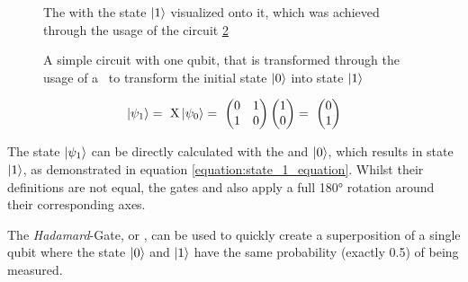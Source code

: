 \begin{figure}[!h]
    \centering
    \scalebox{\blochwidth}{
        
    }
    \caption{The \bloch with the state $\ket{1}$ visualized onto it, which was achieved through the usage of the circuit \ref{figure:x_circuit}}
    \label{figure:state_1_bloch_sphere}
\end{figure}

\begin{figure}[!h]
    \centering{}
    \caption{A simple circuit with one qubit, that is transformed through the usage of a \rxgate\ to transform the initial state $\ket{0}$ into state $\ket{1}$}
    \label{figure:x_circuit}
\end{figure}


\begin{equation}
    \centering
    \begin{split}
        \ket{\psi_1} =\ \mathrm{X}\ket{\psi_0} =\ \begin{pmatrix} 0 & 1\\ 1 & 0\end{pmatrix}\begin{pmatrix}1 \\ 0\end{pmatrix} =\ \begin{pmatrix}0 \\ 1 \end{pmatrix}\\
    \end{split}
    \label{equation:state_1_equation}
\end{equation}

The state $\ket{\psi_1}$ can be directly calculated with the \xgate and $\ket{0}$, which results in state $\ket{1}$, as demonstrated in equation \ref{equation:state_1_equation}. Whilst their definitions are not equal, the gates \ygate\cite{qiskit_ygate_nodate} and \zgate\cite{qiskit_zgate_nodate} also apply a full 180° rotation around their corresponding axes. \par
\newpage
The \emph{Hadamard}-Gate, or \hgate\cite{qiskit_hgate_nodate}, can be used to quickly create a superposition of a single qubit where the state $\ket{0}$ and $\ket{1}$ have the same probability (exactly 0.5) of being measured.

